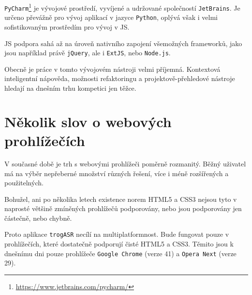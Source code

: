 \verb|PyCharm|\footnote{\url{https://www.jetbrains.com/pycharm/}} je vývojové prostředí, vyvíjené a udržované společností \verb|JetBrains|. Je určeno převážně pro vývoj aplikací v jazyce \verb|Python|, oplývá však i velmi sofistikovaným prostředím pro vývoj v JS.

JS podpora sahá až na úroveň nativního zapojení všemožných frameworků, jako jsou například právě \verb|jQuery|, ale i \verb|ExtJS|, nebo \verb|Node.js|.

Obecně je práce v tomto vývojovém nástroji velmi příjemná. Kontextová inteligentní nápověda, možnosti refaktoringu a projektově-přehledové nástroje hledají na dnešním trhu kompetici jen těžce.

\section{Několik slov o webových prohlížečích}

V současné době je trh s webovými prohlížeči poměrně rozmanitý. Běžný uživatel má na výběr nepřeberné množství různých řešení, více i méně rozšířených a použitelných.

Bohužel, ani po několika letech existence norem HTML5 a CSS3 nejsou tyto v naprosté většině zmíněných prohlížečů podporovány, nebo jsou podporovány jen částečně, nebo chybně.

Proto aplikace \verb|trogASR| necílí na multiplatformnost. Bude fungovat pouze v prohlížečích, které dostatečně podporují čisté HTML5 a CSS3. Těmito jsou k dnešnímu dni pouze prohlížeče \verb|Google Chrome| (verze 41) a \verb|Opera Next| (verze 29).